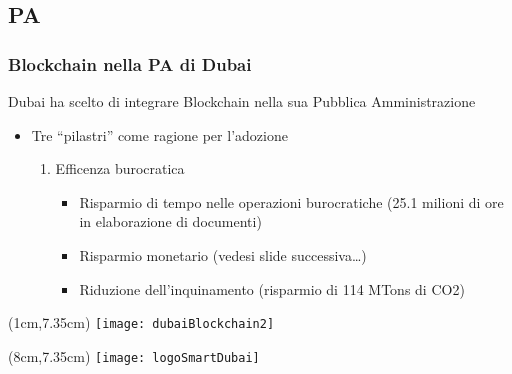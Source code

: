 \subsection{PA}
\begin{frame}
 \frametitle{Blockchain nella PA di Dubai}

 Dubai ha scelto di integrare Blockchain nella sua Pubblica Amministrazione
 \begin{itemize}
  \item<1-> Tre ``pilastri'' come ragione per l'adozione
  \begin{enumerate}
   \item<2-> Efficenza burocratica
   \begin{itemize}
   \item<3-> Risparmio di tempo nelle operazioni burocratiche (25.1 milioni di
ore in elaborazione di documenti)
   \item<4-> Risparmio monetario (vedesi slide successiva\dots)
   \item<5-> Riduzione dell'inquinamento (risparmio di 114 MTons di CO2)
  \end{itemize}
  \end{enumerate}

 \end{itemize}


 \begin{textblock*}{5cm}(1cm,7.35cm)
  \texttt{[image: dubaiBlockchain2]}
 \end{textblock*}

 \begin{textblock*}{5cm}(8cm,7.35cm)
  \texttt{[image: logoSmartDubai]}
 \end{textblock*}

\end{frame}

